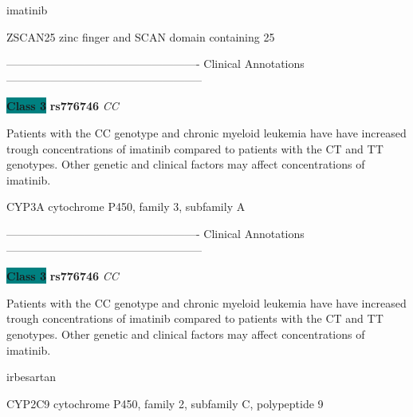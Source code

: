 \documentclass{resume} %
\begin{document}
\begin{rSection}{ imatinib }
\begin{rSubsection}{ ZSCAN25 }{ zinc finger and SCAN domain containing 25 }{}{}
\item[] ---------------------------------------------------- Clinical Annotations -----------------------------------------------------\newline
\item \textbf{\colorbox{teal} {Class 3}} \textbf{ rs776746 } \textit{ CC }
\item[] Patients with the CC genotype and chronic myeloid leukemia have have increased trough concentrations of imatinib compared to patients with the CT and TT genotypes. Other genetic and clinical factors may affect concentrations of imatinib.
\end{rSubsection}\begin{rSubsection}{ CYP3A }{ cytochrome P450, family 3, subfamily A }{}{}
\item[]

\item[] ---------------------------------------------------- Clinical Annotations -----------------------------------------------------\newline
\item \textbf{\colorbox{teal} {Class 3}} \textbf{ rs776746 } \textit{ CC }
\item[] Patients with the CC genotype and chronic myeloid leukemia have have increased trough concentrations of imatinib compared to patients with the CT and TT genotypes. Other genetic and clinical factors may affect concentrations of imatinib.
\end{rSubsection}

\end{rSection}\begin{rSection}{ irbesartan }
\item[]

\begin{rSubsection}{ CYP2C9 }{ cytochrome P450, family 2, subfamily C, polypeptide 9 }{}{}
\item[]


\end{rSubsection}
\end{rSection}
\end{document}
